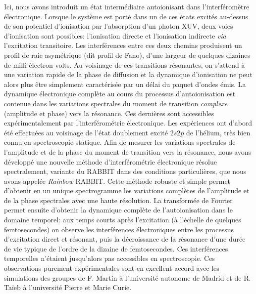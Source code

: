 Ici, nous avons introduit un état intermédiaire autoionisant dans l'interféromètre électronique. Lorsque le système est porté dans un de ces états excités au-dessus de son potentiel d'ionisation par l'absorption d'un photon XUV, deux voies d'ionisation sont possibles: l'ionisation directe et l'ionisation indirecte \textit{via} l'excitation transitoire. Les interférences entre ces deux chemins produisent un profil de raie asymétrique (dit profil de Fano), d'une largeur de quelques dizaines de milli-électron-volts. Au voisinage de ces transitions résonantes, on s'attend à une variation rapide de la phase de diffusion et la dynamique d'ionisation ne peut alors plus être simplement caractérisée par un délai du paquet d'ondes émis. La dynamique électronique complète au cours du processus d'autoionisation est contenue dans les variations spectrales du moment de transition \textit{complexe} (amplitude et phase) vers la résonance. Ces dernières sont accessibles expérimentalement par l'interférométrie électronique. Les expériences ont d'abord été effectuées au voisinage de l'état doublement excité $2s2p$ de l'hélium, très bien connu en spectroscopie statique. Afin de mesurer les variations spectrales de l'amplitude et de la phase du moment de transition vers la résonance, nous avons développé une nouvelle méthode d'interférométrie électronique résolue spectralement, variante du RABBIT dans des conditions particulières, que nous avons appelée  \textit{Rainbow} RABBIT. Cette méthode robuste et simple permet d'obtenir en un unique spectrogramme les variations complètes de l'amplitude et de la phase spectrales avec une haute résolution. La transformée de Fourier permet ensuite d'obtenir la dynamique complète de l'autoionisation dans le domaine temporel: aux temps courts après l'excitation (à l'échelle de quelques femtosecondes) on observe les interférences électroniques entre les processus d'excitation direct et résonant, puis la décroissance de la résonance d'une durée de vie typique de l'ordre de la dizaine de femtosecondes. Ces interférences temporelles n'étaient jusqu'alors pas accessibles en spectroscopie. Ces observations purement expérimentales sont en excellent accord avec les simulations des groupes de F. Mart\'{i}n à l'université autonome de Madrid et de R. Taïeb à l'université Pierre et Marie Curie.

